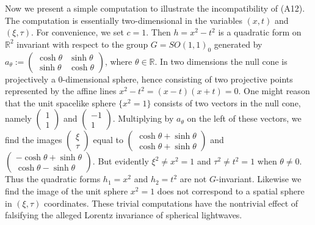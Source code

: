 \documentclass[12pt]{amsart}
\theoremstyle{definition}
\theoremstyle{remark}
\newcommand{\bR}{\mathbb{R}}
\begin{document}

Now we present a simple computation to illustrate the incompatibility of (A12). The computation is essentially two-dimensional in the variables $(x,t)$ and $(\xi, \tau)$. For convenience, we set $c=1$. Then $h=x^2- t^2$ is a quadratic form on $\bR^2$ invariant with respect to the group $G=SO(1,1)_0$ generated by $a_\theta:=\begin{pmatrix} \cosh \theta & \sinh \theta \\
\sinh \theta & \cosh \theta
\end{pmatrix}$, where $\theta\in \bR$. In two dimensions the null cone is projectively a $0$-dimensional sphere, hence consisting of two projective points represented by the affine lines $x^2-t^2=(x-t)(x+t)=0$. One might reason that the unit spacelike sphere $\{x^2=1\}$ consists of two vectors in the null cone, namely $\begin{pmatrix} 1 \\ 1\end{pmatrix}$ and $\begin{pmatrix} -1 \\ 1\end{pmatrix}.$ Multiplying by $a_\theta$ on the left of these vectors, we find the images $\begin{pmatrix} \xi \\ \tau \end{pmatrix}$ equal to $\begin{pmatrix} \cosh \theta+\sinh \theta \\ \cosh \theta+\sinh \theta \end{pmatrix}$ and  $ \begin{pmatrix} -\cosh \theta+\sinh \theta \\ \cosh \theta-\sinh \theta \end{pmatrix}.$ But evidently $\xi^2 \neq x^2=1$ and $\tau^2 \neq t^2=1$ when $\theta\neq 0$. Thus the quadratic forms $h_1=x^2$ and $h_2=t^2$ are not $G$-invariant. Likewise we find the image of the unit sphere $x^2=1$ does not correspond to a spatial sphere in $(\xi, \tau)$ coordinates. These trivial computations have the nontrivial effect of falsifying the alleged Lorentz invariance of spherical lightwaves.
\end{document}
